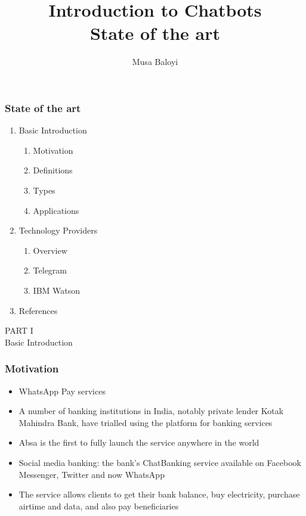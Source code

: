 \documentclass[11pt]{beamer}
\begin{document}
	\author{Musa Baloyi}
	\title{Introduction to Chatbots \\ State of the art} %
	\begin{frame}[plain]
	\maketitle
\end{frame}

\begin{frame}
	\frametitle{State of the art}
	\begin{enumerate}
		\item Basic Introduction
		\begin{enumerate}
			\item Motivation
			\item Definitions
			\item Types
			\item Applications
		\end{enumerate}
		\item Technology Providers
		\begin{enumerate}
			\item Overview
			\item Telegram
			\item IBM Watson
		\end{enumerate}
		\item References
	\end{enumerate}
\end{frame}


\begin{frame}
\begin{center}
	PART I \\ Basic Introduction 
\end{center}
\end{frame}

\begin{frame}
\frametitle{Motivation}
\begin{itemize}
	\item WhatsApp Pay services
	\item A number of banking institutions in India, notably private lender Kotak Mahindra Bank, have trialled using the platform for banking services 
	\item Absa is the first to fully launch the service anywhere in the world
	\item Social media banking: the bank's ChatBanking service available on Facebook Messenger, Twitter and now WhatsApp
	\item The service allows clients to get their bank balance, buy electricity, purchase airtime and data, and also pay beneficiaries
\end{itemize}
\end{frame}
\end{document}
